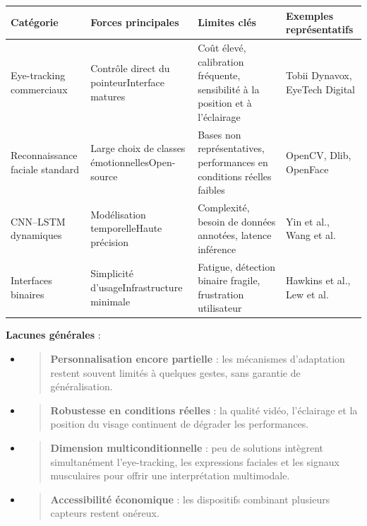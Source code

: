 \documentclass[
]{article}
\begin{document}
\begin{longtable}[]{@{}llll@{}}
\toprule
\textbf{Catégorie} & \textbf{Forces principales} & \textbf{Limites clés} & \textbf{Exemples représentatifs} \\
\midrule
\endhead
Eye-tracking commerciaux & Contrôle direct du pointeurInterface matures & Coût élevé, calibration fréquente, sensibilité à la position et à l'éclairage & Tobii Dynavox, EyeTech Digital \\
Reconnaissance faciale standard & Large choix de classes émotionnellesOpen-source & Bases non représentatives, performances en conditions réelles faibles & OpenCV, Dlib, OpenFace \\
CNN--LSTM dynamiques & Modélisation temporelleHaute précision & Complexité, besoin de données annotées, latence inférence & Yin et al., Wang et al. \\
Interfaces binaires & Simplicité d'usageInfrastructure minimale & Fatigue, détection binaire fragile, frustration utilisateur & Hawkins et al., Lew et al. \\
\bottomrule
\end{longtable}

\textbf{Lacunes générales} :

\begin{itemize}
\item
  \begin{quote}
  \textbf{Personnalisation encore partielle} : les mécanismes d'adaptation restent souvent limités à quelques gestes, sans garantie de généralisation.
  \end{quote}
\item
  \begin{quote}
  \textbf{Robustesse en conditions réelles} : la qualité vidéo, l'éclairage et la position du visage continuent de dégrader les performances.
  \end{quote}
\item
  \begin{quote}
  \textbf{Dimension multiconditionnelle} : peu de solutions intègrent simultanément l'eye-tracking, les expressions faciales et les signaux musculaires pour offrir une interprétation multimodale.
  \end{quote}
\item
  \begin{quote}
  \textbf{Accessibilité économique} : les dispositifs combinant plusieurs capteurs restent onéreux.
  \end{quote}
\end{itemize}
\end{document}
